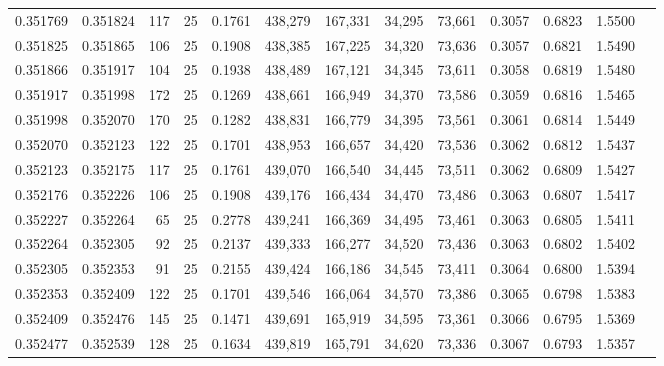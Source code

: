 \begin{tabular}{rrrrrrrrrrrrr}
0.351769 & 0.351824 &   117 &  25 &                                     0.1761 & 438,279 & 167,331 &  34,295 &  73,661 & 0.3057 & 0.6823 & 1.5500 \\
0.351825 & 0.351865 &   106 &  25 &                                     0.1908 & 438,385 & 167,225 &  34,320 &  73,636 & 0.3057 & 0.6821 & 1.5490 \\
0.351866 & 0.351917 &   104 &  25 &                                     0.1938 & 438,489 & 167,121 &  34,345 &  73,611 & 0.3058 & 0.6819 & 1.5480 \\
0.351917 & 0.351998 &   172 &  25 &                                     0.1269 & 438,661 & 166,949 &  34,370 &  73,586 & 0.3059 & 0.6816 & 1.5465 \\
0.351998 & 0.352070 &   170 &  25 &                                     0.1282 & 438,831 & 166,779 &  34,395 &  73,561 & 0.3061 & 0.6814 & 1.5449 \\
0.352070 & 0.352123 &   122 &  25 &                                     0.1701 & 438,953 & 166,657 &  34,420 &  73,536 & 0.3062 & 0.6812 & 1.5437 \\
0.352123 & 0.352175 &   117 &  25 &                                     0.1761 & 439,070 & 166,540 &  34,445 &  73,511 & 0.3062 & 0.6809 & 1.5427 \\
0.352176 & 0.352226 &   106 &  25 &                                     0.1908 & 439,176 & 166,434 &  34,470 &  73,486 & 0.3063 & 0.6807 & 1.5417 \\
0.352227 & 0.352264 &    65 &  25 &                                     0.2778 & 439,241 & 166,369 &  34,495 &  73,461 & 0.3063 & 0.6805 & 1.5411 \\
0.352264 & 0.352305 &    92 &  25 &                                     0.2137 & 439,333 & 166,277 &  34,520 &  73,436 & 0.3063 & 0.6802 & 1.5402 \\
0.352305 & 0.352353 &    91 &  25 &                                     0.2155 & 439,424 & 166,186 &  34,545 &  73,411 & 0.3064 & 0.6800 & 1.5394 \\
0.352353 & 0.352409 &   122 &  25 &                                     0.1701 & 439,546 & 166,064 &  34,570 &  73,386 & 0.3065 & 0.6798 & 1.5383 \\
0.352409 & 0.352476 &   145 &  25 &                                     0.1471 & 439,691 & 165,919 &  34,595 &  73,361 & 0.3066 & 0.6795 & 1.5369 \\
0.352477 & 0.352539 &   128 &  25 &                                     0.1634 & 439,819 & 165,791 &  34,620 &  73,336 & 0.3067 & 0.6793 & 1.5357 \\

\end{tabular}
